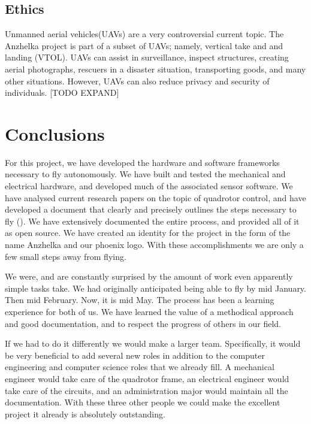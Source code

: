 \documentclass{article}
\numberwithin{equation}{section} %
\begin{document}
\subsection{Ethics}

Unmanned aerial vehicles(UAVs) are a very controversial current topic. The Anzhelka project is part of a subset of UAVs; namely, vertical take and and landing (VTOL). UAVs can assist in surveillance, inspect structures, creating aerial photographs, rescuers in a disaster situation, transporting goods, and many other situations. However, UAVs can also reduce privacy and security of individuals. [TODO EXPAND]




\section{Conclusions}
For this project, we have developed the hardware and software frameworks necessary to fly autonomously. We have built and tested the mechanical and electrical hardware, and developed much of the associated sensor software. We have analysed current research papers on the topic of quadrotor control, and have developed a document that clearly and precisely outlines the steps necessary to fly (\cite{anzhelka_math}). We have extensively documented the entire process, and provided all of it as open source. We have created an identity for the project in the form of the name Anzhelka and our phoenix logo. With these accomplishments we are only a few small steps away from flying.

We were, and are constantly surprised by the amount of work even apparently simple tasks take. We had originally anticipated being able to fly by mid January. Then mid February. Now, it is mid May. The process has been a learning experience for both of us. We have learned the value of a methodical approach and good documentation, and to respect the progress of others in our field.

If we had to do it differently we would make a larger team. Specifically, it would be very beneficial to add several new roles in addition to the computer engineering and computer science roles that we already fill. A mechanical engineer would take care of the quadrotor frame, an electrical engineer would take care of the circuits, and an administration major would maintain all the documentation. With these three other people we could make the excellent project it already is absolutely outstanding.
\end{document}
